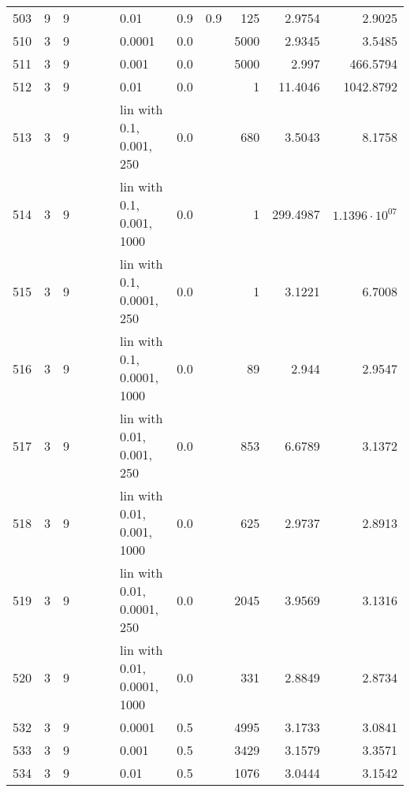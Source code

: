 \begin{longtable}{lrrrrrlrrrrr}
  503 &       9 & 9 &   &   &   &                        0.01 &      0.9 &    0.9 &     125 &                 2.9754 &                 2.9025 \\
  510 &       3 & 9 &   &   &   &                      0.0001 &      0.0 &        &    5000 &                 2.9345 &                 3.5485 \\
  511 &       3 & 9 &   &   &   &                       0.001 &      0.0 &        &    5000 &                  2.997 &               466.5794 \\
  512 &       3 & 9 &   &   &   &                        0.01 &      0.0 &        &       1 &                11.4046 &              1042.8792 \\
  513 &       3 & 9 &   &   &   &    lin with 0.1, 0.001, 250 &      0.0 &        &     680 &                 3.5043 &                 8.1758 \\
  514 &       3 & 9 &   &   &   &   lin with 0.1, 0.001, 1000 &      0.0 &        &       1 &               299.4987 &  $1.1396\cdot 10^{07}$ \\
  515 &       3 & 9 &   &   &   &   lin with 0.1, 0.0001, 250 &      0.0 &        &       1 &                 3.1221 &                 6.7008 \\
  516 &       3 & 9 &   &   &   &  lin with 0.1, 0.0001, 1000 &      0.0 &        &      89 &                  2.944 &                 2.9547 \\
  517 &       3 & 9 &   &   &   &   lin with 0.01, 0.001, 250 &      0.0 &        &     853 &                 6.6789 &                 3.1372 \\
  518 &       3 & 9 &   &   &   &  lin with 0.01, 0.001, 1000 &      0.0 &        &     625 &                 2.9737 &                 2.8913 \\
  519 &       3 & 9 &   &   &   &  lin with 0.01, 0.0001, 250 &      0.0 &        &    2045 &                 3.9569 &                 3.1316 \\
  520 &       3 & 9 &   &   &   & lin with 0.01, 0.0001, 1000 &      0.0 &        &     331 &                 2.8849 &                 2.8734 \\
  532 &       3 & 9 &   &   &   &                      0.0001 &      0.5 &        &    4995 &                 3.1733 &                 3.0841 \\
  533 &       3 & 9 &   &   &   &                       0.001 &      0.5 &        &    3429 &                 3.1579 &                 3.3571 \\
  534 &       3 & 9 &   &   &   &                        0.01 &      0.5 &        &    1076 &                 3.0444 &                 3.1542 \\

\end{longtable}
